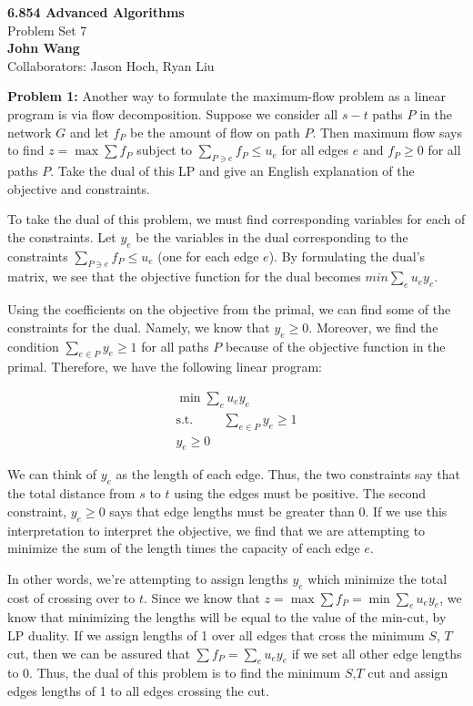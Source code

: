 \documentclass[psamsfonts]{amsart}
\newenvironment{sol}{\vspace{0.25cm}{\large \bfseries Solution:}}{\qedsymbol}
\newenvironment{prob}[1]{\begin{framed}{\large \bfseries Problem #1:}}{\end{framed}}
\newcommand{\makenewtitle}{
    \begin{center}
    {\huge \bfseries 6.854 Advanced Algorithms} \\
    Problem Set 7\\
    \vspace{0.25cm}
    {\bfseries John Wang} \\
    Collaborators: Jason Hoch, Ryan Liu 
    \end{center}
    \vspace{0.5cm}
}
\begin{document}
\makenewtitle

\begin{prob}{1}
Another way to formulate the maximum-flow problem as a linear program is via flow decomposition. Suppose we consider all $s-t$ paths $P$ in the network $G$ and let $f_P$ be the amount of flow on path $P$. Then maximum flow says to find $z = \max \sum f_P$ subject to $\sum_{P \ni e} f_P \leq u_e$ for all edges $e$ and $f_P \geq 0$ for all paths $P$. Take the dual of this LP and give an English explanation of the objective and constraints.
\end{prob}

\begin{sol}
To take the dual of this problem, we must find corresponding variables for each of the constraints. Let $y_{e}$ be the variables in the dual corresponding to the constraints $\sum_{P \ni e} f_P \leq u_e$ (one for each edge $e$). By formulating the dual's matrix, we see that the objective function for the dual becomes $min \sum_{e} u_e y_e$. 

Using the coefficients on the objective from the primal, we can find some of the constraints for the dual. Namely, we know that $y_e \geq 0$. Moreover, we find the condition $\sum_{e \in P} y_e \geq 1$ for all paths $P$ because of the objective function in the primal. Therefore, we have the following linear program:

\begin{eqnarray}
\min \sum_e u_e y_e \\
\text{s.t.} \hspace{1cm} \sum_{e \in P} y_e \geq 1 \\
y_e \geq 0
\end{eqnarray}

We can think of $y_e$ as the length of each edge. Thus, the two constraints say that the total distance from $s$ to $t$ using the edges must be positive. The second constraint, $y_e \geq 0$ says that edge lengths must be greater than 0. If we use this interpretation to interpret the objective, we find that we are attempting to minimize the sum of the length times the capacity of each edge $e$. 

In other words, we're attempting to assign lengths $y_e$ which minimize the total cost of crossing over to $t$. Since we know that $z = \max \sum f_P = \min \sum_{e} u_e y_e$, we know that minimizing the lengths will be equal to the value of the min-cut, by LP duality. If we assign lengths of 1 over all edges that cross the minimum $S$, $T$ cut, then we can be assured that $\sum f_P = \sum_{e} u_e y_e$ if we set all other edge lengths to 0. Thus, the dual of this problem is to find the minimum $S$,$T$ cut and assign edges lengths of 1 to all edges crossing the cut. 
\end{sol}
\end{document}
